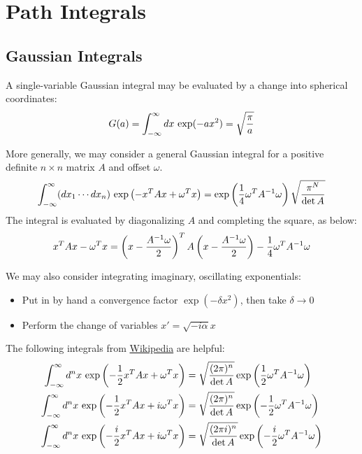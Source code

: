 \section{Path Integrals}
\subsection{Gaussian Integrals}
A single-variable Gaussian integral may be evaluated by a change into spherical coordinates: 
\begin{equation}
    G(a)=\int_{-\infty}^\infty dx\, \exp(-ax^2)=\sqrt{\dfrac \pi a}
\end{equation}

More generally, we may consider a general Gaussian integral for a positive definite $n\times n$ matrix $A$
and offset $\omega$. 
\begin{equation}\label{eqn:real_multivariable_gaussian}
    \int_{-\infty}^\infty (dx_1\cdots dx_n)\, \exp\left(-x^TAx + \omega^Tx\right)=
    \exp\left(\dfrac 1 4 \omega^TA^{-1}\omega\right)\sqrt{\dfrac {\pi^N}{\det A}}
\end{equation}
The integral is evaluated by diagonalizing $A$ and completing the square, as below:
\[x^TAx - \omega^Tx = \left(x - \dfrac{A^{-1}\omega}2\right)^TA\left(x-\dfrac{A^{-1}\omega}2\right) 
- \dfrac 1 4 \omega^TA^{-1}\omega\]

We may also consider integrating imaginary, oscillating exponentials: 
\begin{itemize}
    \item Put in by hand a convergence factor \(\exp(-\delta x^2)\), then take $\delta\to 0$
    \item Perform the change of variables $x'=\sqrt{-i\alpha} x$
\end{itemize}
The following integrals from \href{https://en.wikipedia.org/wiki/Common_integrals_in_quantum_field_theory}{Wikipedia}
are helpful:
\begin{equation}\label{eqn:complex_multivariable_gaussian}
\begin{aligned}
    \int_{-\infty}^\infty d^nx\, \exp\left(-\dfrac 1 2x^T A x + \omega^Tx \right) &= \sqrt{\dfrac{(2\pi)^n}{\det A}}\exp
        \left(\dfrac 1 2 \omega^T A^{-1} \omega\right)
    \\ 
    \int_{-\infty}^\infty d^nx\, \exp\left(-\dfrac 1 2x^T A x + i\omega^Tx \right) &= \sqrt{\dfrac{(2\pi)^n}{\det A}}\exp
    \left(-\dfrac 1 2 \omega^T A^{-1} \omega\right)
    \\ 
    \int_{-\infty}^\infty d^nx\, \exp\left(-\dfrac i 2x^T A x + i\omega^Tx \right) &= \sqrt{\dfrac{(2\pi i)^n}{\det A}}\exp
    \left(-\dfrac i 2 \omega^T A^{-1} \omega\right)
\end{aligned}
\end{equation}

